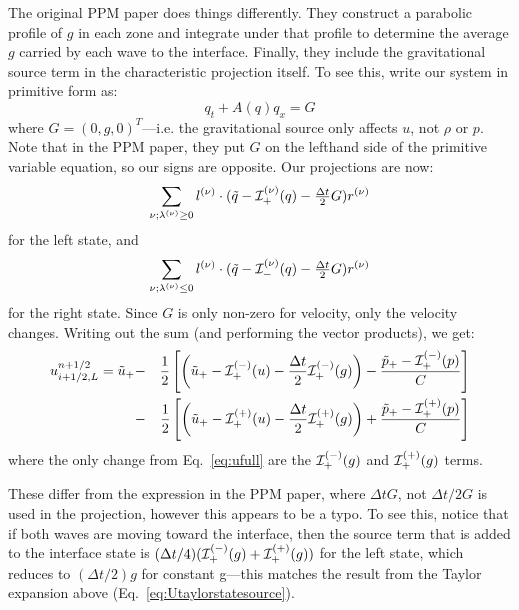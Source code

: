 \begin{itemize}
The original PPM paper does things differently.  They construct a parabolic
profile of $g$ in each zone and integrate under that profile to determine
the average $g$ carried by each wave to the interface.  Finally, they include
the gravitational source term in the characteristic projection itself.
To see this, write our system in primitive form as:
\begin{equation}
q_t + A(q) q_x = G
\end{equation}
where $G = (0, g, 0)^T$---i.e. the gravitational source only affects
$u$, not $\rho$ or $p$.  Note that in the PPM paper, they put $G$ on 
the lefthand side of the primitive variable equation, so our signs are
opposite.  Our projections are now:
\begin{equation}
\sum_{\nu; \lambda^{(\nu)} \ge 0}l^{(\nu)} \cdot (\tilde{q} - \mathcal{I}^{(\nu)}_+(q) - \tfrac{\Delta t}{2} G) r^{(\nu)}
\end{equation}
for the left state, and
\begin{equation}
\sum_{\nu; \lambda^{(\nu)} \le 0} l^{(\nu)} \cdot (\tilde{q} - \mathcal{I}^{(\nu)}_-(q) - \tfrac{\Delta t}{2} G) r^{(\nu)} 
\end{equation}
for the right state.  Since $G$ is only non-zero for velocity, only
the velocity changes.  Writing out the sum (and performing the vector products), we
get:
\begin{eqnarray}
u_{i+1/2,L}^{n+1/2} =
   \tilde{u}_+ 
  &-& \frac{1}{2} \left [
      \left (\tilde{u}_+ - \mathcal{I}_+^{(-)}(u) - \frac{\Delta t}{2} \mathcal{I}^{(-)}_+(g) \right ) - 
       \frac{\tilde{p}_+ - \mathcal{I}_+^{(-)}(p)}{C} \right ] \nonumber \\
  &-& \frac{1}{2} \left [
      \left (\tilde{u}_+ - \mathcal{I}_+^{(+)}(u) - \frac{\Delta t}{2} \mathcal{I}^{(+)}_+(g) \right ) +
       \frac{\tilde{p}_+ - \mathcal{I}_+^{(+)}(p)}{C} \right ]
\end{eqnarray}
where the only change from Eq.~\ref{eq:ufull} are the
$\mathcal{I}^{(-)}_+(g)$ and $\mathcal{I}^{(+)}_+(g)$ terms.  

These differ from the expression in the PPM paper, where $\Delta t G$,
not $\Delta t/2 G$ is used in the projection, however this appears to
be a typo.  To see this, notice that if both waves are moving toward
the interface, then the source term that is added to the interface
state is $(\Delta t/4) (\mathcal{I}_+^{(-)}(g) +
\mathcal{I}_+^{(+)}(g))$ for the left state, which reduces to $(\Delta
t/2) g$ for constant g---this matches the result from the Taylor
expansion above (Eq.~\ref{eq:Utaylorstatesource}).




\end{itemize}

